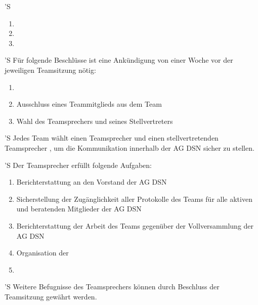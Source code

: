\documentclass[draft,parskip=half-,DIV=12,mpinclude]{scrartcl}
\begin{document}
\begin{contract}
'S 
\begin{enumerate}
  \item {}
  \item {}
  \item {}
\end{enumerate}

'S Für folgende Beschlüsse ist eine Ankündigung von einer Woche vor der jeweiligen Teamsitzung nötig:
\begin{enumerate}
  \item {}
  \item Ausschluss eines Teammitglieds aus dem Team
  \item Wahl des Teamsprechers und seines Stellvertreters
\end{enumerate}


'S Jedes Team wählt einen Teamsprecher und einen stellvertretenden Teamsprecher , um die Kommunikation innerhalb der AG DSN sicher zu stellen.

'S Der Teamsprecher erfüllt folgende Aufgaben:
\begin{enumerate}
  \item Berichterstattung an den Vorstand der AG DSN
  \item Sicherstellung der Zugänglichkeit aller Protokolle des Teams für alle aktiven und beratenden Mitglieder der AG DSN
  \item Berichterstattung der Arbeit des Teams gegenüber der Vollversammlung der AG DSN
  \item Organisation der 
  \item {}
\end{enumerate}

'S Weitere Befugnisse des Teamsprechers können durch Beschluss der Teamsitzung gewährt werden.


\end{contract}
\end{document}
